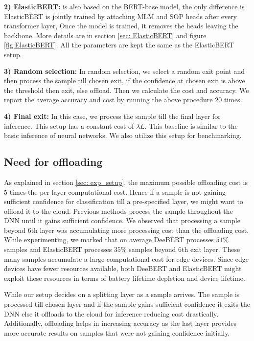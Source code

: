     
\textbf{2) ElasticBERT:} is also based on the BERT-base model, the only difference is ElasticBERT is jointly trained by attaching MLM and SOP heads after every transformer layer, Once the model is trained, it removes the heads leaving the backbone. More details are in section \ref{sec: ElasticBERT} and figure \ref{fig:ElasticBERT}. All the parameters are kept the same as the ElasticBERT setup.

\textbf{3) Random selection:} In random selection, we select a random exit point and then process the sample till chosen exit, if the confidence at chosen exit is above the threshold then exit, else offload. Then we calculate the cost and accuracy. We report the average accuracy and cost by running the above procedure 20 times.

\textbf{4) Final exit:} In this case, we process the sample till the final layer for inference. This setup has a constant cost of $\lambda L$. This baseline is similar to the basic inference of neural networks. We also utilize this setup for benchmarking.

\vspace{-0.5cm}
\subsection{Need for offloading}
As explained in section \ref{sec: exp_setup}, the maximum possible offloading cost is $5$-times the per-layer computational cost. Hence if a sample is not gaining sufficient confidence for classification till a pre-specified layer, we might want to offload it to the cloud. Previous methods process the sample throughout the DNN until it gains sufficient confidence. We observed that processing a sample beyond $6$th layer was accumulating more processing cost than the offloading cost. While experimenting, we marked that on average DeeBERT processes $51\%$ samples and ElasticBERT processes $35\%$ samples beyond $6$th exit layer. These many samples accumulate a large computational cost for edge devices. Since edge devices have fewer resources available, both DeeBERT and ElasticBERT might exploit these resources in terms of battery lifetime depletion and device lifetime.



While our setup decides on a splitting layer as a sample arrives. The sample is processed till chosen layer and if the sample gains sufficient confidence it exits the DNN else it offloads to the cloud for inference reducing cost drastically. Additionally, offloading helps in increasing accuracy as the last layer provides more accurate results on samples that were not gaining confidence initially. 



